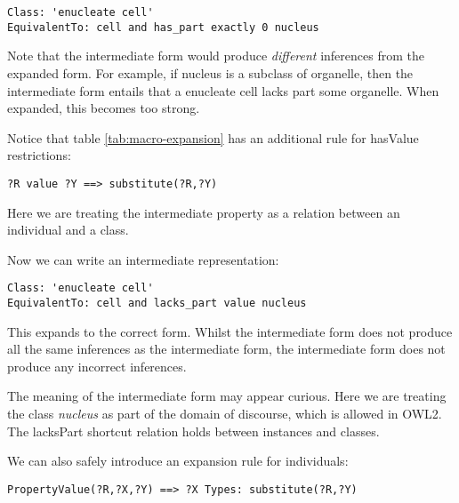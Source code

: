 \documentclass{llncs}
\begin{document}
\begin{verbatim}
Class: 'enucleate cell'
EquivalentTo: cell and has_part exactly 0 nucleus
\end{verbatim}


Note that the intermediate form would produce \emph{different}
inferences from the expanded form. For example, if nucleus is a
subclass of organelle, then the intermediate form entails that a
enucleate cell lacks part some organelle. When expanded, this becomes
too strong.

Notice that table \ref{tab:macro-expansion} has an additional rule for
hasValue restrictions:

\begin{verbatim}
?R value ?Y ==> substitute(?R,?Y)
\end{verbatim}

Here we are treating the intermediate property as a relation between
an individual and a class.

Now we can write an intermediate representation:

\begin{verbatim}
Class: 'enucleate cell'
EquivalentTo: cell and lacks_part value nucleus
\end{verbatim}


This expands to the correct form. Whilst the intermediate form does
not produce all the same inferences as the intermediate form, the
intermediate form does not produce any incorrect inferences.


The meaning of the intermediate form may appear curious.  Here we are
treating the class \emph{nucleus} as part of the domain of discourse,
which is allowed in OWL2. The lacksPart shortcut relation holds between
instances  and classes.

We can also safely introduce an expansion rule for individuals:

\begin{verbatim}
PropertyValue(?R,?X,?Y) ==> ?X Types: substitute(?R,?Y)
\end{verbatim}
\end{document}
